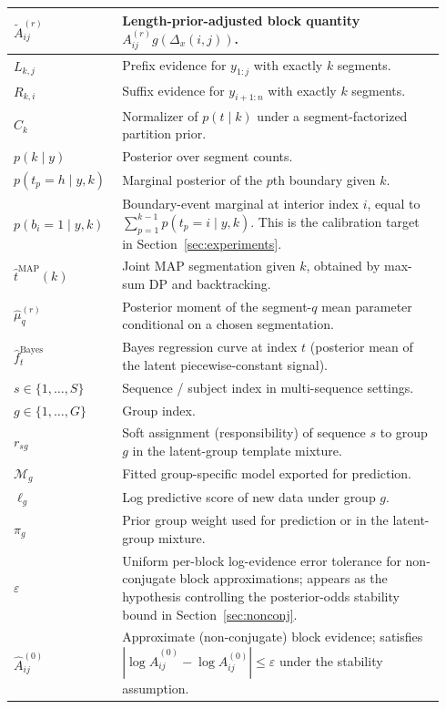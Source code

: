 \begin{longtable}{@{}p{0.22\linewidth}p{0.72\linewidth}@{}}
$\widetilde A^{(r)}_{ij}$ & Length-prior-adjusted block quantity $A^{(r)}_{ij}g(\Delta_x(i,j))$. \\
\midrule
$L_{k,j}$ & Prefix evidence for $y_{1:j}$ with exactly $k$ segments. \\
$R_{k,i}$ & Suffix evidence for $y_{i+1:n}$ with exactly $k$ segments. \\
$C_k$ & Normalizer of $p(t\mid k)$ under a segment-factorized partition prior. \\
$p(k\mid y)$ & Posterior over segment counts. \\
$p(t_p=h\mid y,k)$ & Marginal posterior of the $p$th boundary given $k$. \\
$p(b_i=1\mid y,k)$ & Boundary-event marginal at interior index $i$, equal to $\sum_{p=1}^{k-1} p(t_p=i\mid y,k)$. This is the calibration target in Section~\ref{sec:experiments}. \\
\midrule
$\widehat t^{\mathrm{MAP}}(k)$ & Joint MAP segmentation given $k$, obtained by max-sum DP and backtracking. \\
$\widehat\mu_q^{(r)}$ & Posterior moment of the segment-$q$ mean parameter conditional on a chosen segmentation. \\
$\widehat f_t^{\mathrm{Bayes}}$ & Bayes regression curve at index $t$ (posterior mean of the latent piecewise-constant signal). \\
\midrule
$s\in\{1,\dots,S\}$ & Sequence / subject index in multi-sequence settings. \\
$g\in\{1,\dots,G\}$ & Group index. \\
$r_{sg}$ & Soft assignment (responsibility) of sequence $s$ to group $g$ in the latent-group template mixture. \\
\midrule
$\mathcal{M}_g$ & Fitted group-specific model exported for prediction. \\
$\ell_g$ & Log predictive score of new data under group $g$. \\
$\pi_g$ & Prior group weight used for prediction or in the latent-group mixture. \\
\midrule
$\varepsilon$ & Uniform per-block log-evidence error tolerance for non-conjugate block approximations; appears as the hypothesis controlling the posterior-odds stability bound in Section~\ref{sec:nonconj}. \\
$\widehat A^{(0)}_{ij}$ & Approximate (non-conjugate) block evidence; satisfies $|\log\widehat A^{(0)}_{ij} - \log A^{(0)}_{ij}| \le \varepsilon$ under the stability assumption. \\

\end{longtable}
